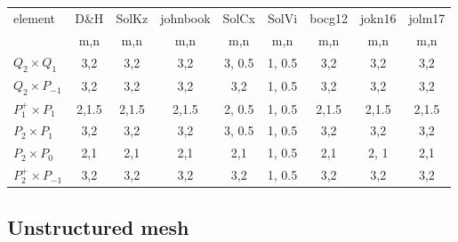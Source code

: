 \begin{scriptsize}
\begin{center}
\begin{tabular}{|l|c|c|c|c|c|c|c|c|}
\hline
element & 
D\&H  & 
SolKz &  
johnbook  & 
SolCx &  
SolVi & 
bocg12& 
jokn16 & 
jolm17 \\
& 
m,n& 
m,n& 
m,n& 
m,n& 
m,n& 
m,n&
m,n&
m,n\\
\hline
$Q_2\times Q_1$       & 
{\color{teal} 3,2}     & 
{\color{teal} 3,2}      & 
{\color{teal} 3,2}    & 
3, 0.5   & 
1, 0.5 & 
{\color{teal} 3,2}  & 
{\color{teal} 3,2}  &
{\color{teal} 3,2} \\ 
$Q_2\times P_{-1}$    & 
{\color{teal}3,2}   & 
{\color{teal}3,2}     & 
{\color{teal}3,2}    & 
{\color{teal}3,2}     & 
1, 0.5 & 
{\color{teal}3,2}   & 
{\color{teal}3,2}    &
{\color{teal}3,2}  \\ 
$P_1^+\times P_{1}$   & 
{\color{teal} 2,1.5}  & 
{\color{teal} 2,1.5}  & 
{\color{teal} 2,1.5}  & 
2, 0.5 & 
1, 0.5 & 
{\color{teal} 2,1.5}  & 
{\color{teal} 2,1.5}  & 
{\color{teal} 2,1.5}  \\ 
$P_2\times P_1$       & 
{\color{teal}3,2}   & 
{\color{teal}3,2}   & 
{\color{teal}3,2}   & 
3, 0.5   & 
1, 0.5 & 
{\color{teal}3,2}   & 
{\color{teal}3,2}   & 
{\color{teal}3,2}   \\ 
$P_2\times P_0$       & 
{\color{teal}2,1}   & 
{\color{teal}2,1}   & 
{\color{teal}2,1}   & 
{\color{teal}2,1}   & 
1, 0.5 & 
{\color{teal}2,1}   & 
2, 1 & 
{\color{teal}2,1}   \\ 
$P_2^+\times P_{-1}$  & 
{\color{teal}3,2}     & 
{\color{teal}3,2}     & 
{\color{teal}3,2}     & 
{\color{teal}3,2}     & 
1, 0.5 & 
{\color{teal}3,2}     & 
{\color{teal}3,2}     & 
{\color{teal}3,2}     \\ 
\hline
\end{tabular}
\end{center}
\end{scriptsize}

\subsection*{Unstructured mesh}

